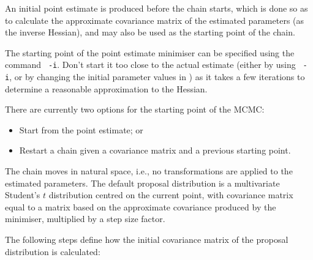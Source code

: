 An initial point estimate is produced before the chain starts, which is done so as to calculate the approximate covariance matrix of the estimated parameters (as the inverse Hessian), and may also be used as the starting point of the chain.

The starting point of the point estimate minimiser can be specified using the command \texttt{\cname\ -i}. Don't start it too close to the actual estimate (either by using \texttt{\cname\ -i}, or by changing the initial parameter values in \config) as it takes a few iterations to determine a reasonable approximation to the Hessian.

There are currently two options for the starting point of the MCMC:

\begin{itemize}
\item Start from the point estimate; or
\item Restart a chain given a covariance matrix and a previous starting point.
\end{itemize}

The chain moves in natural space, i.e., no transformations are applied to the estimated parameters. The default proposal distribution is a multivariate Student's $t$ distribution centred on the current point, with covariance matrix equal to a matrix based on the approximate covariance produced by the minimiser, multiplied by a step size factor.

The following steps define how the initial covariance matrix of the proposal distribution is calculated:

